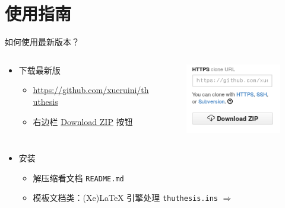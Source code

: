 \documentclass[xcolor=table,dvipsnames,svgnames]{beamer}
\begin{document}
\section{使用指南}
\begin{frame}{如何使用最新版本？}
      \begin{columns}
        \begin{column}{.7\textwidth}
  \begin{itemize}
    \item 下载最新版
      \begin{itemize}
        \item \url{https://github.com/xueruini/thuthesis}
        \item 右边栏
          \href{https://github.com/xueruini/thuthesis/archive/master.zip}%
          {Download ZIP} 按钮
      \end{itemize}
  \end{itemize}
        \end{column}
        \begin{column}{.3\textwidth}
          \begin{figure}[htbp]
            \centering
            \includegraphics[width=.8\textwidth]{thuthesis-download.png}
          \end{figure}
        \end{column}
      \end{columns}
  \begin{itemize}
    \item 安装
      \begin{itemize}
        \item 解压缩看文档 \texttt{README.md}
        \item 模板文档类：(Xe)LaTeX 引擎处理 \texttt{thuthesis.ins} $\Rightarrow$

\end{itemize}
\end{itemize}
\end{frame}
\end{document}
